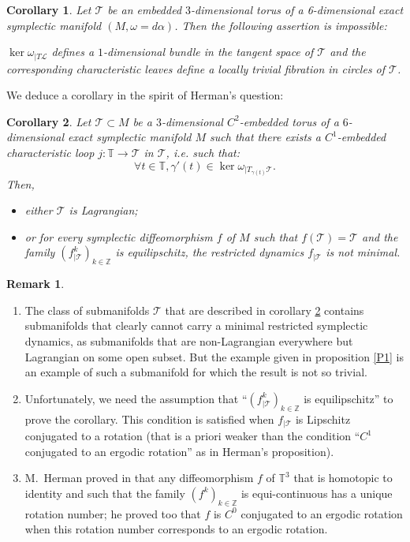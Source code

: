 \documentclass{dcds}
\newtheorem{corollary}{Corollary}
\theoremstyle{definition}
\newtheorem{remark}{Remark}
\begin{document}
\begin{corollary}\label{Co0}
 Let ${\mathcal {T}}$ be an embedded $3$-dimensional torus  of a 6-dimensional exact symplectic manifold $(M,\omega=d\alpha)$. Then the following assertion is impossible:

  $\ker\omega_{|T{\mathcal {L}}}$ defines a $1$-dimensional bundle in the tangent space of  ${\mathcal {T}}$ and the corresponding  characteristic leaves
 define a   locally trivial fibration in circles of ${\mathcal {T}}$.

\end{corollary}
 We deduce a corollary in the spirit of Herman's question:
 \begin{corollary}\label{Co1}
 Let   ${\mathcal {T}}\subset M$ be a $3$-dimensional $C^2$-embedded torus  of a $6$-dimensional  exact symplectic manifold $M$ such that
  there exists a $C^1$-embedded characteristic loop $j:{\mathbb {T}} \rightarrow {\mathcal {T}}$ in ${\mathcal {T}}$, i.e.  such that:
$$\forall t \in{\mathbb {T}} , \gamma'(t)\in\ker\omega_{|T_{\gamma(t)}{\mathcal {T}}}.$$
Then,
\begin{itemize}
\item either ${\mathcal {T}}$ is Lagrangian;
\item or for every symplectic diffeomorphism $f$ of $M$ such that $f({\mathcal {T}})={\mathcal {T}}$ and the family $(f^k_{|{\mathcal {T}}})_{k\in{\mathbb {Z}}}$ is equilipschitz, the restricted dynamics $f_{|{\mathcal {T}}}$ is not minimal.
\end{itemize}
\end{corollary}

\begin{remark}\begin{enumerate}
\item The class of submanifolds ${\mathcal {T}}$ that are described in corollary \ref{Co1} contains submanifolds that clearly cannot carry   a minimal restricted symplectic dynamics, as submanifolds that are non-Lagrangian everywhere but Lagrangian on some open subset. But the example given in proposition \ref{P1} is an example of such a submanifold for which the result is not so   trivial.
\item Unfortunately, we need the assumption that ``$(f^k_{|{\mathcal {T}}})_{k\in{\mathbb {Z}}}$ is equilipschitz'' to prove the corollary. This condition is satisfied when $f_{|{\mathcal {T}}}$ is Lipschitz conjugated to a  rotation (that is a priori weaker than the condition ``$C^1$ conjugated to an ergodic  rotation'' as in Herman's proposition).
\item M.~Herman proved in \cite{He2} that any diffeomorphism $f$ of ${\mathbb {T}}^3$ that is homotopic to identity and such that the family $(f^k)_{k\in{\mathbb {Z}}}$ is equi-continuous has a unique rotation number; he proved too that $f$    is $C^0$ conjugated to an ergodic rotation when this rotation number corresponds to an ergodic rotation.
\end{enumerate}
\end{remark}
\end{document}
